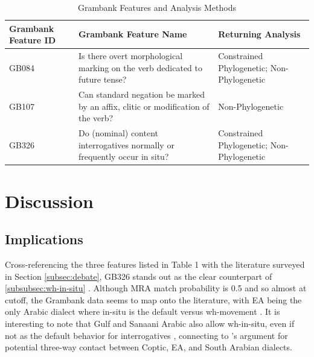 \documentclass[12pt,a4paper]{article}
\begin{document}
\begin{table}[H]
\centering
\caption{Grambank Features and Analysis Methods}
\label{tab:grambank_features}
\begin{tabular}{>{\raggedright\arraybackslash}p{2.5cm}>{\raggedright\arraybackslash}p{5cm}>{\raggedright\arraybackslash}p{4cm}}
\toprule
\textbf{Grambank Feature ID} & \textbf{Grambank Feature Name} & \textbf{Returning Analysis} \\
\midrule
GB084 & Is there overt morphological marking on the verb dedicated to future tense? & Constrained Phylogenetic; Non-Phylogenetic \\
GB107 & Can standard negation be marked by an affix, clitic or modification of the verb? & Non-Phylogenetic \\
GB326 & Do (nominal) content interrogatives normally or frequently occur in situ? & Constrained Phylogenetic; Non-Phylogenetic \\
\bottomrule
\end{tabular}
\end{table}

\section{Discussion}
\label{sec:discussion}

\subsection{Implications}

Cross-referencing the three features listed in Table 1 with the literature surveyed in Section \ref{subsec:debate}, GB326 stands out as the clear counterpart of \ref{subsubsec:wh-in-situ} . Although MRA match probability is 0.5 and so almost at cutoff, the Grambank data seems to map onto the literature, with EA being the only Arabic dialect where in-situ is the default versus wh-movement \parencite{skirgard_grambank_2023}. It is interesting to note that Gulf and Sanaani Arabic also allow wh-in-situ, even if not as the default behavior for interrogatives \parencite{skirgard_grambank_2023}, connecting to \textcite{abdelrahman_linguistic_2023}'s argument for potential three-way contact between Coptic, EA, and South Arabian dialects. 
\end{document}
